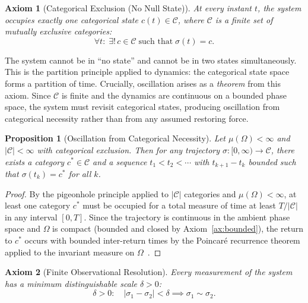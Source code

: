 \documentclass[aps,prd,twocolumn,superscriptaddress,floatfix,nofootinbib]{revtex4-2}
\newtheorem{proposition}[theorem]{Proposition}
\newtheorem{axiom}{Axiom}
\theoremstyle{remark}
\begin{document}
\begin{axiom}[Categorical Exclusion (No Null State)]
\label{ax:exclusion}
At every instant $t$, the system occupies exactly one categorical state $c(t) \in \mathcal{C}$, where $\mathcal{C}$ is a finite set of mutually exclusive categories:
\begin{equation}
    \boxed{\forall t: \; \exists!\, c \in \mathcal{C} \;\text{such that}\; \sigma(t) = c.}
    \label{eq:exclusion}
\end{equation}
\end{axiom}

The system cannot be in ``no state'' and cannot be in two states simultaneously. This is the partition principle applied to dynamics: the categorical state space forms a partition of time. Crucially, oscillation arises as a \emph{theorem} from this axiom. Since $\mathcal{C}$ is finite and the dynamics are continuous on a bounded phase space, the system must revisit categorical states, producing oscillation from categorical necessity rather than from any assumed restoring force.

\begin{proposition}[Oscillation from Categorical Necessity]
\label{prop:oscillation}
Let $\mu(\Omega) < \infty$ and $|\mathcal{C}| < \infty$ with categorical exclusion. Then for any trajectory $\sigma: [0, \infty) \to \mathcal{C}$, there exists a category $c^* \in \mathcal{C}$ and a sequence $t_1 < t_2 < \cdots$ with $t_{k+1} - t_k$ bounded such that $\sigma(t_k) = c^*$ for all $k$.
\end{proposition}

\begin{proof}
By the pigeonhole principle applied to $|\mathcal{C}|$ categories and $\mu(\Omega) < \infty$, at least one category $c^*$ must be occupied for a total measure of time at least $T / |\mathcal{C}|$ in any interval $[0, T]$. Since the trajectory is continuous in the ambient phase space and $\Omega$ is compact (bounded and closed by Axiom~\ref{ax:bounded}), the return to $c^*$ occurs with bounded inter-return times by the Poincar\'e recurrence theorem applied to the invariant measure on $\Omega$~\cite{landau1980statistical}.
\end{proof}

\begin{axiom}[Finite Observational Resolution]
\label{ax:resolution}
Every measurement of the system has a minimum distinguishable scale $\delta > 0$:
\begin{equation}
    \boxed{\delta > 0: \quad |\sigma_1 - \sigma_2| < \delta \implies \sigma_1 \sim \sigma_2.}
    \label{eq:resolution}
\end{equation}
\end{axiom}
\end{document}
